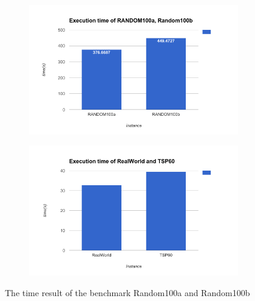\begin{figure}
		\centering
		\begin{subfigure}{.45\textwidth}
				\includegraphics[width=1\linewidth]{img/TSPRANDOM100a-bTIme.png}
			\caption{}
						\label{fig:sub:tsprandom100ab}
		\end{subfigure}
		\begin{subfigure}{.45\textwidth}
			\includegraphics[width=\linewidth]{img/firstAssignment/TSP60RealWorld.png}		
			\caption{}
						\label{fig:sub:tsp60RealWorld}

		\end{subfigure}
		
		\caption{The time result of the benchmark Random100a and Random100b}
		
\end{figure}

